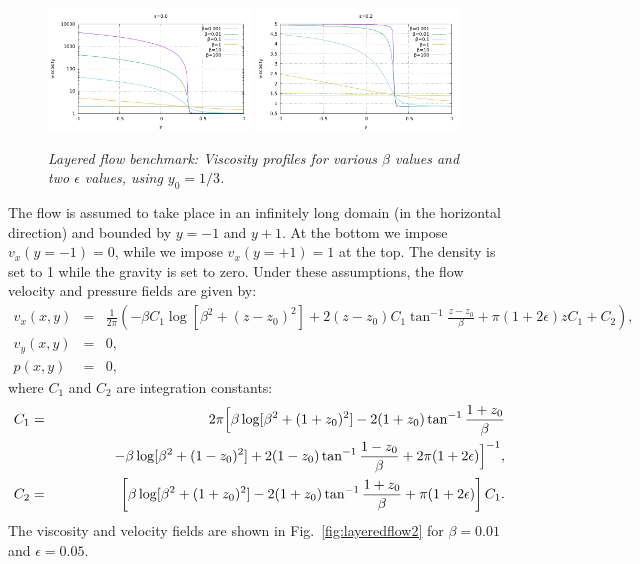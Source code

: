 \documentclass{article}
\begin{document}
\begin{figure}
\begin{center}
  \centering
  \includegraphics[width=0.48\textwidth]{cookbooks/benchmarks/layeredflow/viscosityA}
  \includegraphics[width=0.48\textwidth]{cookbooks/benchmarks/layeredflow/viscosityD}
  \caption{\it Layered flow benchmark: Viscosity profiles for various
    $\beta$ values and two $\epsilon$ values, using $y_0=1/3$.} 
  \label{fig:layeredflow1}
\end{center}
\end{figure}

The flow is assumed to take place in an infinitely long domain (in the horizontal direction)
and bounded by $y=-1$ and $y+1$.
At the bottom we impose $v_x(y=-1)=0$, while we impose $v_x(y=+1)=1$ at the top.
The density is set to 1 while the gravity is set to zero.
Under these assumptions, the flow velocity and pressure fields are given by:
\begin{eqnarray}
v_x(x,y)&=&\frac{1}{2\pi} \left(  -\beta C_1 \log [\beta^2 + (z-z_0)^2]  + 2 (z-z_0)  C_1 \tan^{-1} \frac{z-z_0}{\beta} + \pi (1+2\epsilon) z C_1  + C_2 \right), \nonumber\\
v_y(x,y) &=& 0, \nonumber\\ 
p(x,y) &=& 0,
\end{eqnarray}
where $C_1$ and $C_2$ are integration constants:
\begin{eqnarray*}
C_1 &=& 2\pi \Bigl[ 
 \beta  \log [\beta^2 + (1+z_0)^2]  -  2(1+z_0) \tan^{-1}
 \frac{1+z_0}{\beta}
 \\
 &&\qquad\qquad
-\beta  \log [\beta^2 + (1-z_0)^2]  +  2(1-z_0) \tan^{-1} \frac{1-z_0}{\beta} + 2\pi (1+2\epsilon)   \Bigr]^{-1},\\
C_2 &=& \left[ \beta  \log [\beta^2 + (1+z_0)^2]  -  2(1+z_0) \tan^{-1} \frac{1+z_0}{\beta} + \pi(1+2\epsilon) \right]C_1.
\end{eqnarray*}
The viscosity and velocity fields are shown in Fig.~\ref{fig:layeredflow2} for $\beta=0.01$ and $\epsilon=0.05$. 
\end{document}
